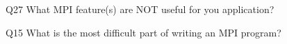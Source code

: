 \begin{description}%
\item{Q27} What MPI feature(s) are NOT useful for you application?%
\item{Q15} What is the most difficult part of writing an MPI program?%
\end{description}%
